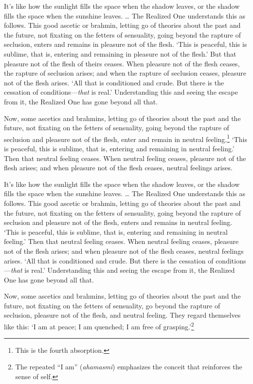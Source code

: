 \documentclass[12pt,openany]{book}%
\begin{document}
It’s like how the sunlight fills the space when the shadow leaves, or the shadow fills the space when the sunshine leaves. … The Realized One understands this as follows. This good ascetic or brahmin, letting go of theories about the past and the future, not fixating on the fetters of sensuality, going beyond the rapture of seclusion, enters and remains in pleasure not of the flesh. ‘This is peaceful, this is sublime, that is, entering and remaining in pleasure not of the flesh.’ But that pleasure not of the flesh of theirs ceases. When pleasure not of the flesh ceases, the rapture of seclusion arises; and when the rapture of seclusion ceases, pleasure not of the flesh arises. ‘All that is conditioned and crude. But there is the cessation of conditions—\emph{that} is real.’ Understanding this and seeing the escape from it, the Realized One has gone beyond all that. 

Now, some ascetics and brahmins, letting go of theories about the past and the future, not fixating on the fetters of sensuality, going beyond the rapture of seclusion and pleasure not of the flesh, enter and remain in neutral feeling.\footnote{This is the fourth absorption. } ‘This is peaceful, this is sublime, that is, entering and remaining in neutral feeling.’ Then that neutral feeling ceases. When neutral feeling ceases, pleasure not of the flesh arises; and when pleasure not of the flesh ceases, neutral feelings arises. 

It’s like how the sunlight fills the space when the shadow leaves, or the shadow fills the space when the sunshine leaves. … The Realized One understands this as follows. This good ascetic or brahmin, letting go of theories about the past and the future, not fixating on the fetters of sensuality, going beyond the rapture of seclusion and pleasure not of the flesh, enters and remains in neutral feeling. ‘This is peaceful, this is sublime, that is, entering and remaining in neutral feeling.’ Then that neutral feeling ceases. When neutral feeling ceases, pleasure not of the flesh arises; and when pleasure not of the flesh ceases, neutral feelings arises. ‘All that is conditioned and crude. But there is the cessation of conditions—\emph{that} is real.’ Understanding this and seeing the escape from it, the Realized One has gone beyond all that. 

Now, some ascetics and brahmins, letting go of theories about the past and the future, not fixating on the fetters of sensuality, go beyond the rapture of seclusion, pleasure not of the flesh, and neutral feeling. They regard themselves like this: ‘I am at peace; I am quenched; I am free of grasping.’\footnote{The repeated “I am” (\textit{ahamasmi}) emphasizes the conceit that reinforces the sense of self. } 
\end{document}
